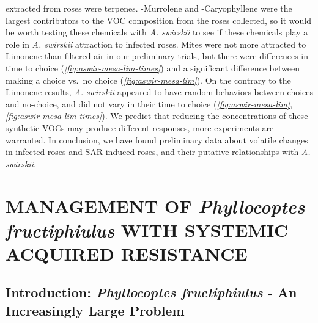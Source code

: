 \documentclass{ufdissertation}[overrideChapters] %
\begin{document}
{extracted from roses were terpenes. \textgamma-Murrolene and \textbeta-Caryophyllene were the largest contributors to the VOC composition from the roses collected, so it would be worth testing these chemicals with \emph{A. swirskii} to see if these chemicals play a role in \emph{A. swirskii} attraction to infected roses. Mites were not more attracted to Limonene than filtered air in our preliminary trials, but there were differences in time to choice (\emph{\ref{fig:aswir-mesa-lim-times}}) and a significant difference between making a choice vs.~no choice (\emph{\ref{fig:aswir-mesa-lim}}). On the contrary to the Limonene results, \emph{A. swirskii} appeared to have random behaviors between choices and no-choice, and did not vary in their time to choice (\emph{\ref{fig:aswir-mesa-lim}}, \emph{\ref{fig:aswir-mesa-lim-times}}). We predict that reducing the concentrations of these synthetic VOCs may produce different responses, more experiments are warranted. In conclusion, we have found preliminary data about volatile changes in infected roses and SAR-induced roses, and their putative relationships with \emph{A. swirskii}.

\hypertarget{management-of-phyllocoptes-fructiphiulus-with-systemic-acquired-resistance}{%
\chapter{\texorpdfstring{MANAGEMENT OF \emph{Phyllocoptes fructiphiulus} WITH SYSTEMIC ACQUIRED RESISTANCE}{MANAGEMENT OF Phyllocoptes fructiphiulus WITH SYSTEMIC ACQUIRED RESISTANCE}}\label{management-of-phyllocoptes-fructiphiulus-with-systemic-acquired-resistance}}

\hypertarget{introduction-phyllocoptes-fructiphiulus---an-increasingly-large-problem}{%
\section{\texorpdfstring{Introduction: \emph{Phyllocoptes fructiphiulus} - An Increasingly Large Problem}{Introduction: Phyllocoptes fructiphiulus - An Increasingly Large Problem}}\label{introduction-phyllocoptes-fructiphiulus---an-increasingly-large-problem}}

}
\end{document}
